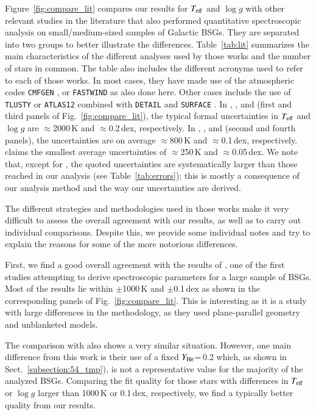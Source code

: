 \documentclass{aa}
\newcommand{\Teff}{\mbox{$T_{\rm eff}$}\xspace}
\newcommand{\logg}{\mbox{$\log g$}\xspace}
\newcommand{\He}{$Y_{\rm He}$\xspace}
\begin{document}
Figure~\ref{fig:compare_lit} compares our results for \Teff and \logg with other relevant studies in the literature that also performed quantitative spectroscopic analysis on small/medium-sized samples of Galactic BSGs. They are separated into two groups to better illustrate the differences. Table~\ref{tab:lit} summarizes the main characteristics of the different analyses used by those works and the number of stars in common. The table also includes the different acronyms used to refer to each of those works. In most cases, they have made use of the atmospheric codes {\tt CMFGEN} \citep{hillier98}, or {\tt FASTWIND} as also done here. Other cases include the use of {\tt TLUSTY} \citep{hubeny88} or {\tt ATLAS12} \citep{kurucz05} combined with {\tt DETAIL} \citep{giddings81} and {\tt SURFACE} \citep{butler85}. In \citet{mcerlean99}, \citet{crowther06}, and \citet{searle08} (first and third panels of Fig.~\ref{fig:compare_lit}), the typical formal uncertainties in \Teff and \logg are $\approx$2000\,K and $\approx$0.2\,dex, respectively. In \citet{lefever07}, \citet{markova08}, and \citet{haucke18} (second and fourth panels), the uncertainties are on average $\approx$800\,K and $\approx$0.1\,dex, respectively. \citet{webmayer22} claims the smallest average uncertainties of $\approx$250\,K and $\approx$0.05\,dex. We note that, except for \citet{webmayer22}, the quoted uncertainties are systematically larger than those reached in our analysis (see Table~\ref{tab:errors}); this is mostly a consequence of our analysis method and the way our uncertainties are derived.

The different strategies and methodologies used in those works make it very difficult to assess the overall agreement with our results, as well as to carry out individual comparisons. Despite this, we provide some individual notes and try to explain the reasons for some of the more notorious differences. 

First, we find a good overall agreement with the results of \citet{mcerlean99}, one of the first studies attempting to derive spectroscopic parameters for a large sample of BSGs. Most of the results lie within $\pm$1000\,K and $\pm$0.1\,dex as shown in the corresponding panels of Fig.~\ref{fig:compare_lit}. This is interesting as it is a study with large differences in the methodology, as they used plane-parallel geometry and unblanketed models. 

The comparison with \citet{crowther06} also shows a very similar situation. However, one main difference from this work is their use of a fixed \He=\,0.2 which, as shown in Sect.~\ref{subsection:54_tmp}), is not a representative value for the majority of the analyzed BSGs. Comparing the fit quality for those stars with differences in \Teff or \logg larger than 1000\,K or 0.1\,dex, respectively, we find a typically better quality from our results.
\end{document}
